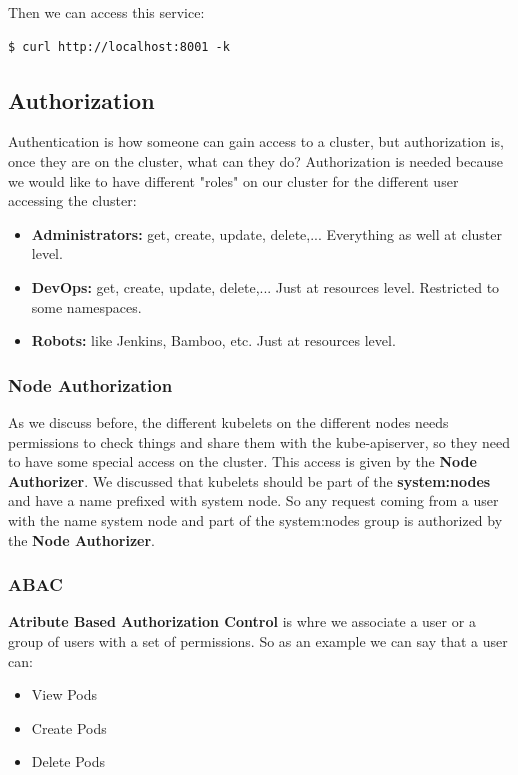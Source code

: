 \documentclass{article}
\newenvironment{codetemplate}[1][]{%
  \mybasecolorbox[#1]
  \itshape
}{%
  \endmybasecolorbox
}
\begin{document}
Then we can access this service:
\begin{codetemplate}{}
\begin{verbatim}
$ curl http://localhost:8001 -k
\end{verbatim}
\end{codetemplate}

\subsection{Authorization}
Authentication is how someone can gain access to a cluster, but authorization is, once they are on the cluster, what can they do? Authorization is needed because we would like to have different "roles" on our cluster for the different
user accessing the cluster: 
\begin{itemize}
    \item \textbf{Administrators:} get, create, update, delete,... Everything as well at cluster level.
    \item \textbf{DevOps:} get, create, update, delete,... Just at resources level. Restricted to some namespaces.
    \item \textbf{Robots:} like Jenkins, Bamboo, etc. Just at resources level.
\end{itemize}

\subsubsection{Node Authorization}
As we discuss before, the different kubelets on the different nodes needs permissions to check things and
share them with the kube-apiserver, so they need to have some special access on the cluster. This access is given by the \textbf{Node Authorizer}. We discussed
that kubelets should be part of the \textbf{system:nodes} and have a name prefixed with system node.
So any request coming from a user with the name system node and part of the system:nodes group is authorized by the \textbf{Node Authorizer}.

\subsubsection{ABAC}
\textbf{Atribute Based Authorization Control} is whre we associate a user or a group of users with a set of permissions.
So as an example we can say that a user can:
\begin{itemize}
    \item View Pods
    \item Create Pods
    \item Delete Pods
\end{itemize}
\end{document}
